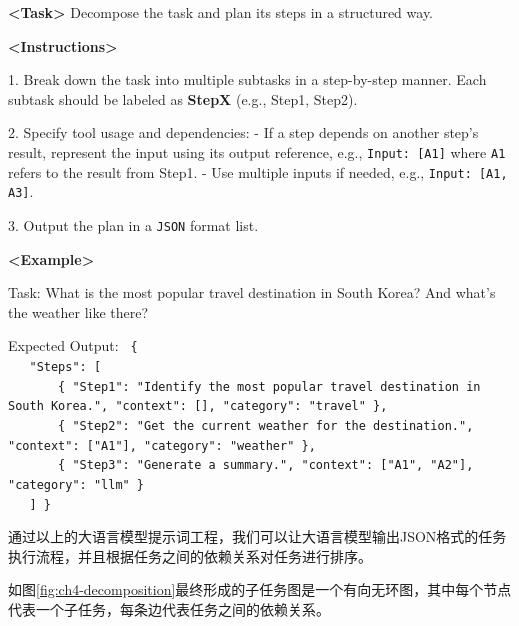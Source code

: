 \begin{center}
\begin{tcolorbox}[colback=bgcolor, colframe=black, width=0.95\textwidth, boxrule=0.5mm, 
coltitle=white, colbacktitle=titlecolor, title=Task Decomposition and Response Planning with GPT-4]


\textbf{<Task>} Decompose the task and plan its steps in a structured way. 

\textbf{<Instructions>} 

1. Break down the task into multiple subtasks in a step-by-step manner. Each subtask should be labeled as \textbf{StepX} (e.g., Step1, Step2).  

2. Specify tool usage and dependencies:  
   - If a step depends on another step's result, represent the input using its output reference, e.g., \texttt{Input: [A1]} where \texttt{A1} refers to the result from Step1.  
   - Use multiple inputs if needed, e.g., \texttt{Input: [A1, A3]}.  

3. Output the plan in a \texttt{JSON} format list.  

\textbf{<Example>}  

Task: What is the most popular travel destination in South Korea? And what’s the weather like there?

Expected Output:
\texttt{%
\{ \\
\ \ \ "Steps": [ \\
\ \ \ \ \ \ \ \{ "Step1": "Identify the most popular travel destination in South Korea.", "context": [], "category": "travel" \}, \\
\ \ \ \ \ \ \ \{ "Step2": "Get the current weather for the destination.", "context": ["A1"], "category": "weather" \}, \\
\ \ \ \ \ \ \ \{ "Step3": "Generate a summary.", "context": ["A1", "A2"], "category": "llm" \} \\
\ \ \ ]
\}
}
\end{tcolorbox}
\end{center}

通过以上的大语言模型提示词工程，我们可以让大语言模型输出JSON格式的任务执行流程，并且根据任务之间的依赖关系对任务进行排序。

如图\ref{fig:ch4-decomposition}最终形成的子任务图是一个有向无环图，其中每个节点代表一个子任务，每条边代表任务之间的依赖关系。

